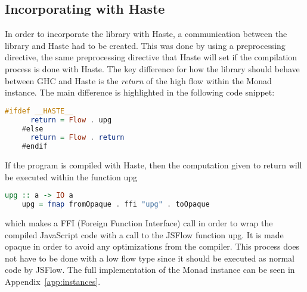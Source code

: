 \subsection{Incorporating with Haste}
In order to incorporate the library with Haste, a communication between the library and Haste had to be created. This was done by using a preprocessing directive, the same preprocessing directive that Haste will set if the compilation process is done with Haste. The key difference for how the library should behave between GHC and Haste is the \emph{return} of the high flow within the Monad instance. The main difference is highlighted in the following code snippet:
\begin{center}
  \begin{lstlisting}[language=Haskell]
    #ifdef __HASTE__
      return = Flow . upg
    #else
      return = Flow . return
    #endif
  \end{lstlisting}
\end{center}
If the program is compiled with Haste, then the computation given to return will be executed within the function upg
\begin{center}
  \begin{lstlisting}[language=Haskell]
    upg :: a -> IO a
    upg = fmap fromOpaque . ffi "upg" . toOpaque
  \end{lstlisting}
\end{center}
which makes a FFI (Foreign Function Interface) call in order to wrap the compiled JavaScript code with a call to the JSFlow function upg. It is made opaque in order to avoid any optimizations from the compiler. This process does not have to be done with a low flow type since it should be executed as normal code by JSFlow. The full implementation of the Monad instance can be seen in Appendix~\ref{app:instances}.
